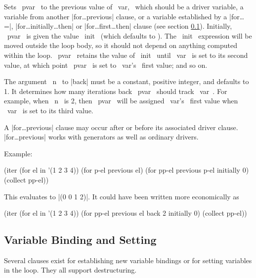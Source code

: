 \begin{clauses}

Sets ~pvar~ to the previous value of ~var,~ which should be a driver
variable, a variable from another |for\dots previous| clause, or a
variable established by a |for\dots =|,
|for\dots initially\dots then| or |for\dots first\dots then| clause
(see section \ref{setting}).
Initially, ~pvar~ is given the value ~init~ (which defaults to \nil).
The ~init~ expression will be moved outside the loop body, so it
should not depend on anything computed within the loop.
~pvar~ retains the value of ~init~ until ~var~ is set to its second
value, at which point ~pvar~ is set to ~var's~ first value; and so on.

\cpar The
argument ~n~ to |back| must be a constant, positive integer, and
defaults to 1.  It determines how many iterations back ~pvar~ should
track ~var~.  For example, when ~n~ is 2, then ~pvar~ will be assigned
~var's~ first value when ~var~ is set to its third value.

\cpar A |for\dots previous| clause may occur after or before its
associated driver clause. |for\dots previous| works with generators as
well as ordinary drivers.

\pagebreak[3]

\cpar Example:
\begin{program}
(iter (for el in '(1 2 3 4))
      (for p-el previous el)
      (for pp-el previous p-el initially 0)
      (collect pp-el))
\end{program}
This evaluates to |(0 0 1 2)|.  It could have been written more
economically as
\begin{program}
(iter (for el in '(1 2 3 4))
      (for pp-el previous el back 2 initially 0)
      (collect pp-el))
\end{program}


\end{clauses}

\subsection{Variable Binding and Setting}
\label{setting}

Several clauses exist for establishing new variable bindings or for
setting variables in the loop.  They all support destructuring.

